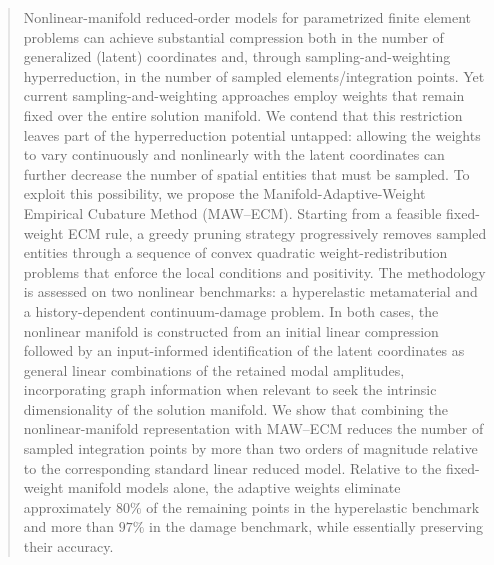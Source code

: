 \documentclass[preprint,10pt]{elsarticle}  %
\begin{document}
\begin{frontmatter}
\begin{abstract}
Nonlinear-manifold reduced-order models for parametrized finite
element problems can achieve substantial compression both in the number
of generalized (latent) coordinates and, through sampling-and-weighting
hyperreduction, in the number of sampled elements/integration points.
Yet current sampling-and-weighting approaches employ weights that remain
fixed over the entire solution manifold. We contend that this restriction
leaves part of the hyperreduction potential untapped: allowing the weights
to vary continuously and nonlinearly with the latent coordinates can
further decrease the number of spatial entities that must be sampled.  To exploit this possibility, we propose the Manifold-Adaptive-Weight
Empirical Cubature Method (MAW--ECM). Starting from a feasible fixed-weight ECM
rule, a greedy pruning strategy progressively removes sampled entities
through a sequence of convex quadratic weight-redistribution problems
that enforce the local   conditions and positivity.
The methodology is assessed on two nonlinear benchmarks:
a hyperelastic metamaterial and a history-dependent continuum-damage
problem. In both cases, the nonlinear manifold is constructed from an
initial linear compression followed by an input-informed identification of
the latent coordinates as general linear combinations of the retained
modal amplitudes, incorporating graph information when relevant to seek
the intrinsic dimensionality of the solution manifold. We show that  combining the nonlinear-manifold representation with MAW--ECM reduces
the number of sampled integration points by more than two orders of
magnitude relative to the corresponding standard linear reduced model.
 Relative to the fixed-weight manifold models alone, the adaptive weights
eliminate approximately \(80\%\) of the remaining  points in
the hyperelastic benchmark and more than \(97\%\) in the damage
benchmark, while essentially preserving their accuracy.



\end{abstract}
%


\end{frontmatter}
\end{document}
